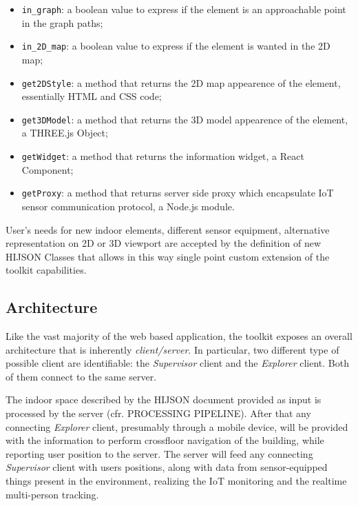\documentclass{sig-alternate}
\begin{document}
\begin{itemize}
\itemsep1pt\parskip0pt
\item
  \texttt{in\_graph}: a boolean value to express if the element is an
  approachable point in the graph paths;
\item
  \texttt{in\_2D\_map}: a boolean value to express if the element is
  wanted in the 2D map;
\item
  \texttt{get2DStyle}: a method that returns the 2D map appearence of
  the element, essentially HTML and CSS code;
\item
  \texttt{get3DModel}: a method that returns the 3D model appearence of
  the element, a THREE.js Object;
\item
  \texttt{getWidget}: a method that returns the information widget, a
  React Component;
\item
  \texttt{getProxy}: a method that returns server side proxy which
  encapsulate IoT sensor communication protocol, a Node.js module.
\end{itemize}

User's needs for new indoor elements, different sensor equipment,
alternative representation on 2D or 3D viewport are accepted by the
definition of new HIJSON Classes that allows in this way single point
custom extension of the toolkit capabilities.

\subsection{Architecture}\label{architecture}

Like the vast majority of the web based application, the toolkit exposes
an overall architecture that is inherently \emph{client/server}. In
particular, two different type of possible client are identifiable: the
\emph{Supervisor} client and the \emph{Explorer} client. Both of them
connect to the same server.

The indoor space described by the HIJSON document provided as input is
processed by the server (cfr. PROCESSING PIPELINE). After that any
connecting \emph{Explorer} client, presumably through a mobile device,
will be provided with the information to perform crossfloor navigation
of the building, while reporting user position to the server. The server
will feed any connecting \emph{Supervisor} client with users positions,
along with data from sensor-equipped things present in the environment,
realizing the IoT monitoring and the realtime multi-person tracking.
\end{document}
